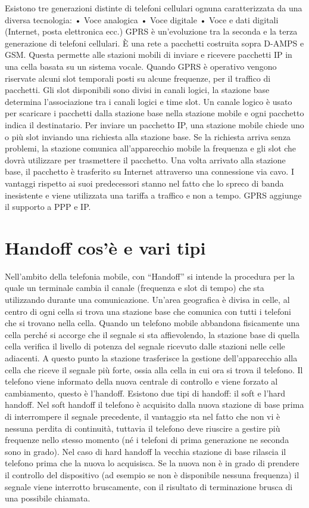 Esistono tre generazioni distinte di telefoni cellulari ognuna caratterizzata da una diversa tecnologia:
•	Voce analogica
•	Voce digitale
•	Voce e dati digitali (Internet, posta elettronica ecc.)
GPRS è un’evoluzione tra la seconda e la terza generazione di telefoni cellulari. È una rete a pacchetti costruita sopra D-AMPS e GSM. Questa permette alle stazioni mobili di inviare e ricevere pacchetti IP in una cella basata su un sistema vocale. Quando GPRS è operativo vengono riservate alcuni slot temporali posti su alcune frequenze, per il traffico di pacchetti.
Gli slot disponibili sono divisi in canali logici, la stazione base determina l’associazione tra i canali logici e time slot. Un canale logico è usato per scaricare i pacchetti dalla stazione base nella stazione mobile e ogni pacchetto indica il destinatario.
Per inviare un pacchetto IP, una stazione mobile chiede uno o più slot inviando una richiesta alla stazione base. Se la richiesta arriva senza problemi, la stazione comunica all’apparecchio mobile la frequenza e gli slot che dovrà utilizzare per trasmettere il pacchetto. Una volta arrivato alla stazione base, il pacchetto è trasferito su Internet attraverso una connessione via cavo.
I vantaggi rispetto ai suoi predecessori stanno nel fatto che lo spreco di banda inesistente e viene utilizzata una tariffa a traffico e non a tempo. GPRS aggiunge il supporto a PPP e IP.

\section{Handoff cos’è e vari tipi}

Nell’ambito della telefonia mobile, con “Handoff” si intende la procedura per la quale un terminale cambia il canale (frequenza e slot di tempo) che sta utilizzando durante una comunicazione.
Un’area geografica è divisa in celle, al centro di ogni cella si trova una stazione base che comunica con tutti i telefoni che si trovano nella cella.
Quando un telefono mobile abbandona fisicamente una cella perché si accorge che il segnale si sta affievolendo, la stazione base di quella cella verifica il livello di potenza del segnale ricevuto dalle stazioni nelle celle adiacenti. A questo punto la stazione trasferisce la gestione dell’apparecchio alla cella che riceve il segnale più forte, ossia alla cella in cui ora si trova il telefono.
Il telefono viene informato della nuova centrale di controllo e viene forzato al cambiamento, questo è l’handoff.
Esistono due tipi di handoff: il soft e l’hard handoff. Nel soft handoff il telefono è acquisito dalla nuova stazione di base prima di interrompere il segnale precedente, il vantaggio sta nel fatto che non vi è nessuna perdita di continuità, tuttavia il telefono deve riuscire a gestire più frequenze nello stesso momento (né i telefoni di prima generazione ne seconda sono in grado).
Nel caso di hard handoff la vecchia stazione di base rilascia il telefono prima che la nuova lo acquisisca. Se la nuova non è in grado di prendere il controllo del dispositivo (ad esempio se non è disponibile nessuna frequenza) il segnale viene interrotto bruscamente, con il risultato di terminazione brusca di una possibile chiamata.


